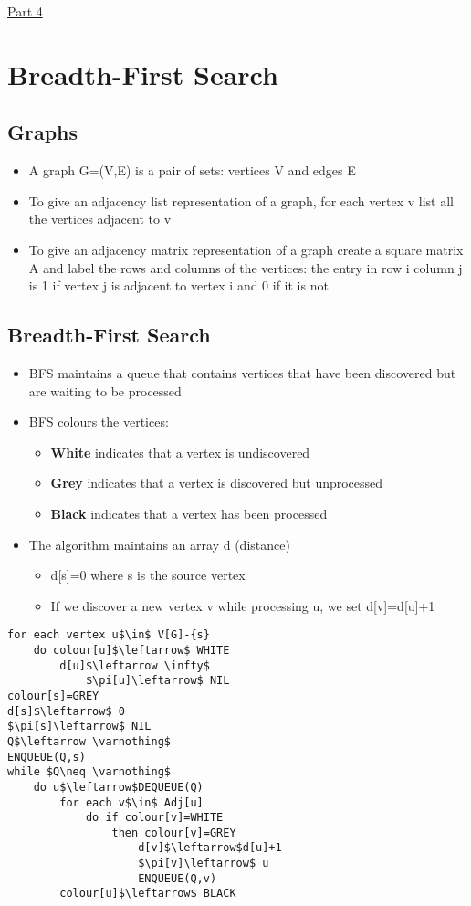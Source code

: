\documentclass{article}[18pt]
\begin{document}
\begin{center}
\underline{\huge Part 4}
\end{center}
\section{Breadth-First Search}
\subsection{Graphs}
\begin{itemize}
	\item A graph G=(V,E) is a pair of sets: vertices V and edges E
	\item To give an adjacency list representation of a graph, for each vertex v list all the vertices adjacent to v
	\item To give an adjacency matrix representation of a graph create a square matrix A and label the rows and columns of the vertices: the entry in row i column j is 1 if vertex j is adjacent to vertex i and 0 if it is not
\end{itemize}
\subsection{Breadth-First Search}
\begin{itemize}
	\item BFS maintains a queue that contains vertices that have been discovered but are waiting to be processed
	\item BFS colours the vertices:
	\begin{itemize}
		\item \textbf{White} indicates that a vertex is undiscovered
		\item \textbf{Grey} indicates that a vertex is discovered but unprocessed
		\item \textbf{Black} indicates that a vertex has been processed
	\end{itemize}
	\item The algorithm maintains an array d (distance)
	\begin{itemize}
		\item d[s]=0 where s is the source vertex
		\item If we discover a new vertex v while processing u, we set d[v]=d[u]+1
	\end{itemize}
\end{itemize}
\begin{lstlisting}[caption={BFS(G,s)}]
for each vertex u$\in$ V[G]-{s}
	do colour[u]$\leftarrow$ WHITE
		d[u]$\leftarrow \infty$
			$\pi[u]\leftarrow$ NIL
colour[s]=GREY
d[s]$\leftarrow$ 0
$\pi[s]\leftarrow$ NIL
Q$\leftarrow \varnothing$
ENQUEUE(Q,s)
while $Q\neq \varnothing$
	do u$\leftarrow$DEQUEUE(Q)
		for each v$\in$ Adj[u]
			do if colour[v]=WHITE
				then colour[v]=GREY
					d[v]$\leftarrow$d[u]+1
					$\pi[v]\leftarrow$ u
					ENQUEUE(Q,v)
		colour[u]$\leftarrow$ BLACK			
\end{lstlisting}
\end{document}
